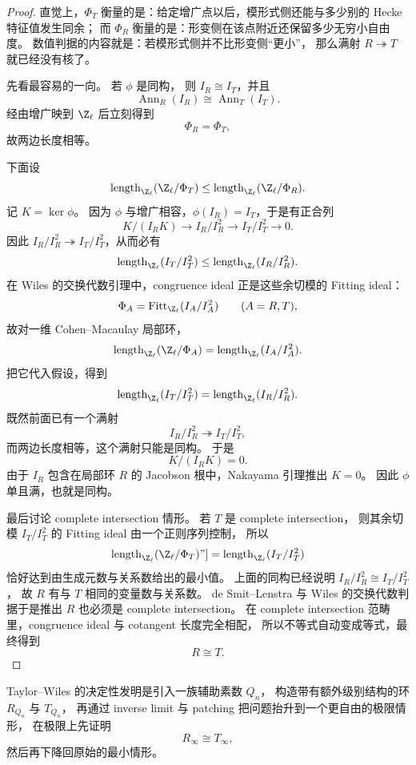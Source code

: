 \begin{proof}
直觉上，$\Phi_T$ 衡量的是：给定增广点以后，模形式侧还能与多少别的 Hecke 特征值发生同余；
而 $\Phi_R$ 衡量的是：形变侧在该点附近还保留多少无穷小自由度。
数值判据的内容就是：若模形式侧并不比形变侧“更小”，
那么满射 $R\twoheadrightarrow T$ 就已经没有核了。

先看最容易的一向。
若 $\phi$ 是同构，
则 $I_R\cong I_T$，并且
\[
  \operatorname{Ann}_R(I_R)\cong \operatorname{Ann}_T(I_T).
\]
经由增广映到 $\Z_\ell$ 后立刻得到
\[
  \Phi_R=\Phi_T,
\]
故两边长度相等。

下面设
\[
  \operatorname{length}_{\Z_\ell}(\Z_\ell/\Phi_T)
  \le
  \operatorname{length}_{\Z_\ell}(\Z_\ell/\Phi_R).
\]
记 $K=\ker\phi$。
因为 $\phi$ 与增广相容，$\phi(I_R)=I_T$，于是有正合列
\[
  K/(I_RK)\longrightarrow I_R/I_R^2\longrightarrow I_T/I_T^2\longrightarrow 0.
\]
因此 $I_R/I_R^2\twoheadrightarrow I_T/I_T^2$，从而必有
\[
  \operatorname{length}_{\Z_\ell}(I_T/I_T^2)
  \le
  \operatorname{length}_{\Z_\ell}(I_R/I_R^2).
\]
在 Wiles 的交换代数引理中，congruence ideal 正是这些余切模的 Fitting ideal：
\[
  \Phi_A=\operatorname{Fitt}_{\Z_\ell}(I_A/I_A^2)
  \qquad (A=R,T),
\]
故对一维 Cohen--Macaulay 局部环，
\[
  \operatorname{length}_{\Z_\ell}(\Z_\ell/\Phi_A)
  =
  \operatorname{length}_{\Z_\ell}(I_A/I_A^2).
\]
把它代入假设，得到
\[
  \operatorname{length}_{\Z_\ell}(I_T/I_T^2)
  =
  \operatorname{length}_{\Z_\ell}(I_R/I_R^2).
\]
既然前面已有一个满射
\[
  I_R/I_R^2\twoheadrightarrow I_T/I_T^2,
\]
而两边长度相等，这个满射只能是同构。
于是
\[
  K/(I_RK)=0.
\]
由于 $I_R$ 包含在局部环 $R$ 的 Jacobson 根中，Nakayama 引理推出 $K=0$。
因此 $\phi$ 单且满，也就是同构。

最后讨论 complete intersection 情形。
若 $T$ 是 complete intersection，
则其余切模 $I_T/I_T^2$ 的 Fitting ideal 由一个正则序列控制，
所以
\[
  \operatorname{length}_{\Z_\ell}(\Z_\ell/\Phi_T)
"]=
  \operatorname{length}_{\Z_\ell}(I_T/I_T^2)
\]
恰好达到由生成元数与关系数给出的最小值。
上面的同构已经说明 $I_R/I_R^2\cong I_T/I_T^2$，
故 $R$ 有与 $T$ 相同的变量数与关系数。
de Smit--Lenstra 与 Wiles 的交换代数判据于是推出 $R$ 也必须是 complete intersection。
在 complete intersection 范畴里，congruence ideal 与 cotangent 长度完全相配，
所以不等式自动变成等式，最终得到
\[
  R\cong T.
\]
\end{proof}

Taylor--Wiles 的决定性发明是引入一族辅助素数 $Q_n$，
构造带有额外级别结构的环 $R_{Q_n}$ 与 $T_{Q_n}$，
再通过 inverse limit 与 patching 把问题抬升到一个更自由的极限情形，
在极限上先证明
\[
  R_\infty\cong T_\infty,
\]
然后再下降回原始的最小情形。

